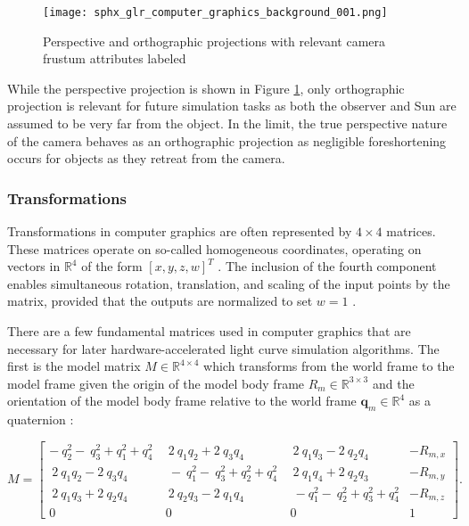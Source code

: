 \begin{figure}[!htb]
  \centering
  \texttt{[image: sphx\_glr\_computer\_graphics\_background\_001.png]}
  \caption{Perspective and orthographic projections with relevant camera frustum attributes labeled}
  \label{fig:ortho_perspective_cameras}
\end{figure}

While the perspective projection is shown in Figure \ref{fig:ortho_perspective_cameras}, only orthographic projection is relevant for future simulation tasks as both the observer and Sun are assumed to be very far from the object. In the limit, the true perspective nature of the camera behaves as an orthographic projection as negligible foreshortening occurs for objects as they retreat from the camera. 

\subsubsection{Transformations} \label{sec:graphics_trans}

Transformations in computer graphics are often represented by $4 \times 4$ matrices. These matrices operate on so-called homogeneous coordinates, operating on vectors in $\mathbb{R}^4$ of the form $\left[ x, y, z, w \right]^T$ \cite{shirley2009}. The inclusion of the fourth component enables simultaneous rotation, translation, and scaling of the input points by the matrix, provided that the outputs are normalized to set $w = 1$ \cite{shirley2009}.

There are a few fundamental matrices used in computer graphics that are necessary for later hardware-accelerated light curve simulation algorithms. The first is the model matrix $M \in \mathbb{R}^{4 \times 4}$ which transforms from the world frame to the model frame given the origin of the model body frame $R_{m} \in \mathbb{R}^{3 \times 3}$ and the orientation of the model body frame relative to the world frame $\mathbf{q}_m \in \mathbb{R}^4$ as a quaternion \cite{shirley2009}:

\begin{equation} \label{eq:model_matrix}
  M = \begin{bmatrix}
    -\ q_2^2-\ q_3^2+q_1^2+q_4^2\ &\ 2\ q_1q_2+2\ q_3q_4&\ 2\ q_1q_3-2\ q_2q_4 & -R_{m,x}\\
    \ 2\ q_1q_2-2\ q_3q_4&\ -\ q_1^2-\ q_3^2+q_2^2+q_4^2\ &\ 2\ q_1q_4+2\ q_2q_3 & -R_{m,y}\\
    \ 2\ q_1q_3+2\ q_2q_4&\ 2\ q_2q_3-2\ q_1q_4&\ -q_1^2-\ q_2^2+q_3^2+q_4^2 & -R_{m,z} \\
    0 & 0 & 0 & 1
  \end{bmatrix}.
\end{equation}

